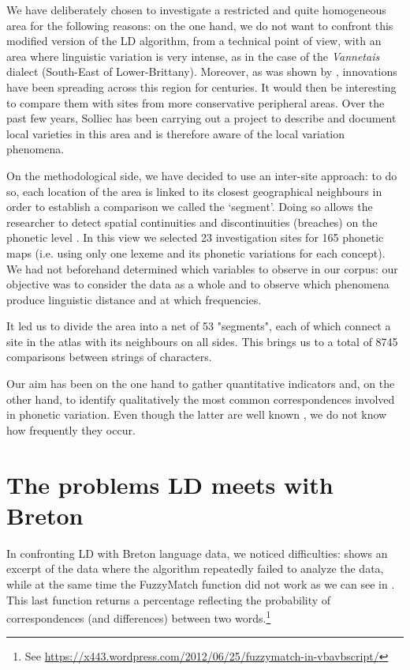 \documentclass[output=paper]{LSP/langsci}
\begin{document}
We have deliberately chosen to investigate a restricted and quite homogeneous area for the following reasons: on the one hand, we do not want to confront this modified version of the LD algorithm, from a technical point of view, with an area where linguistic variation is very intense, as in the case of the \textit{Vannetais} dialect (South-East of Lower-Brittany). Moreover, as was shown by \citet{falchun_perspectives_1981}, innovations have been spreading across this region for centuries. It would then be interesting to compare them with sites from more conservative peripheral areas. Over the past few years, Solliec has been carrying out a project to describe and document local varieties in this area and is therefore aware of the local variation phenomena.

On the methodological side, we have decided to use an inter-site approach: to do so, each location of the area is linked to its closest geographical neighbours in order to establish a comparison we called the ‘segment’. Doing so allows the researcher to detect spatial continuities and discontinuities (breaches) on the phonetic level \citep[137]{goebl_introduction_2012}. In this view we selected 23 investigation sites for 165 phonetic maps (i.e. using only one lexeme and its phonetic variations for each concept). We had not beforehand determined which variables to observe in our corpus: our objective was to consider the data as a whole and to observe which phenomena produce linguistic distance and at which frequencies.

It led us to divide the area into a net of 53 "segments", each of which connect a site in the atlas with its neighbours on all sides. This brings us to a total of 8745 comparisons between strings of characters.

Our aim has been on the one hand to gather quantitative indicators and, on the other hand, to identify qualitatively the most common correspondences involved in phonetic variation. Even though the latter are well known \citep{falchun_perspectives_1981,jackson_historical_1967}, we do not know how frequently they occur.

\section{The problems LD meets with Breton} 
In confronting LD with Breton language data, we noticed difficulties:  shows an excerpt of the data where the algorithm repeatedly failed to analyze the data, while at the same time the FuzzyMatch function did not work as we can see in . This last function returns a percentage reflecting the probability of correspondences (and differences) between two words.\footnote{See  \url{https://x443.wordpress.com/2012/06/25/fuzzymatch-in-vbavbscript/}}
\end{document}
